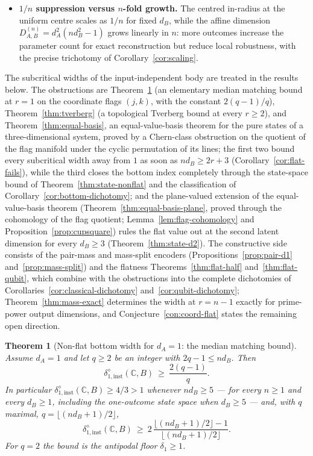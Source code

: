 \documentclass[11pt,a4paper]{article}
\newtheorem{theorem}{Theorem}[section]
\begin{document}
\begin{itemize}[leftmargin=*,itemsep=3pt]
\item \textbf{$1/n$ suppression versus $n$-fold growth.} The centred in-radius at the uniform centre scales as $1/n$ for fixed $d_B$, while the affine dimension $D_{A,B}^{(n)}=d_A^2(nd_B^2-1)$ grows linearly in $n$: more outcomes increase the parameter count for exact reconstruction but reduce local robustness, with the precise trichotomy of Corollary~\ref{cor:scaling}.
\end{itemize}

The subcritical widths of the input-independent body are treated in the results
below. The obstructions are Theorem~\ref{thm:nonflat-d1} (an elementary median
matching bound at $r=1$ on the coordinate flags $(j,k)$, with the constant $2(q-1)/q$), Theorem~\ref{thm:tverberg}
(a topological Tverberg bound at every $r\ge2$), and Theorem~\ref{thm:equal-basis}, an
equal-value-basis theorem for the pure states of a three-dimensional system, proved
by a Chern-class obstruction on the quotient of the flag manifold under the cyclic
permutation of its lines; the first two bound every subcritical
width away from $1$ as soon as $nd_B\ge2r+3$ (Corollary~\ref{cor:flat-fails}), while
the third closes the bottom index completely through the state-space bound of Theorem~\ref{thm:state-nonflat} and the classification of Corollary~\ref{cor:bottom-dichotomy}; and the plane-valued extension of the equal-value-basis theorem (Theorem~\ref{thm:equal-basis-plane}, proved through the cohomology of the flag quotient; Lemma~\ref{lem:flag-cohomology} and Proposition~\ref{prop:cupsquare}) rules the flat value out at the second latent dimension for every $d_B\ge3$ (Theorem~\ref{thm:state-d2}). The
constructive side consists of the pair-mass and mass-split encoders
(Propositions~\ref{prop:pair-d1} and~\ref{prop:mass-split}) and the flatness
Theorems~\ref{thm:flat-half} and~\ref{thm:flat-qubit}, which combine with the
obstructions into the complete dichotomies of Corollaries~\ref{cor:classical-dichotomy}
and~\ref{cor:qubit-dichotomy}; Theorem~\ref{thm:mass-exact} determines the width at
$r=n-1$ exactly for prime-power output dimensions, and Conjecture~\ref{con:coord-flat}
states the remaining open direction.

\begin{theorem}[Non-flat bottom width for $d_A=1$: the median matching bound]
\label{thm:nonflat-d1}
Assume $d_A=1$ and let $q\ge2$ be an integer with $2q-1\le nd_B$. Then
\[
\delta_{1,\mathrm{inst}}^{\diamond}(\mathbb C,B)\ \ge\ \frac{2(q-1)}{q}.
\]
In particular $\delta_{1,\mathrm{inst}}^{\diamond}(\mathbb C,B)\ge4/3>1$ whenever
$nd_B\ge5$ --- for every $n\ge1$ and every $d_B\ge1$, including the one-outcome state
space when $d_B\ge5$ --- and, with $q$ maximal, $q=\lfloor(nd_B+1)/2\rfloor$,
\[
\delta_{1,\mathrm{inst}}^{\diamond}(\mathbb C,B)\ \ge\
2\,\frac{\lfloor(nd_B+1)/2\rfloor-1}{\lfloor(nd_B+1)/2\rfloor}.
\]
For $q=2$ the bound is the antipodal floor $\delta_1\ge1$.
\end{theorem}
\end{document}
